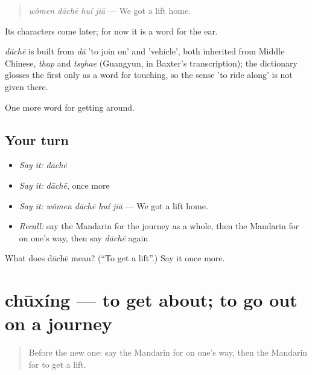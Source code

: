 \begin{quote}
\emph{wǒmen dāchē huí jiā} — We got a lift home.
\end{quote}

Its characters come later; for now it is a word for the ear.

\begin{cousinweb}
\emph{dāchē} is built from \emph{dā} 'to join on' and  'vehicle', both inherited from Middle Chinese, \emph{thap} and \emph{tsyhae} (Guangyun, in Baxter's transcription); the dictionary glosses the first only as a word for touching, so the sense 'to ride along' is not given there.
\end{cousinweb}

\begin{grammarlens}[title={What you've built}]
One more word for getting around.
\end{grammarlens}

\subsection*{Your turn}
\begin{itemize}
\raggedright
  \item \emph{Say it:} \emph{dāchē}
  \item \emph{Say it:} \emph{dāchē}, once more
  \item \emph{Say it:} \emph{wǒmen dāchē huí jiā} — We got a lift home.
  \item \emph{Recall:} say the Mandarin for the journey as a whole, then the Mandarin for on one's way, then say \emph{dāchē} again
\end{itemize}

\begin{tcolorbox}[breakable,colback=teal!4,colframe=teal!35!black,title={Before you move on}]
What does dāchē mean? (\textquotedblleft{}To get a lift\textquotedblright{}.) Say it once more.
\end{tcolorbox}
\section[chūxíng]{chūxíng — to get about; to go out on a journey}

\label{lesson:ZH-C429-chuxing}



\begin{quote}
Before the new one: say the Mandarin for on one's way, then the Mandarin for to get a lift.
\end{quote}

